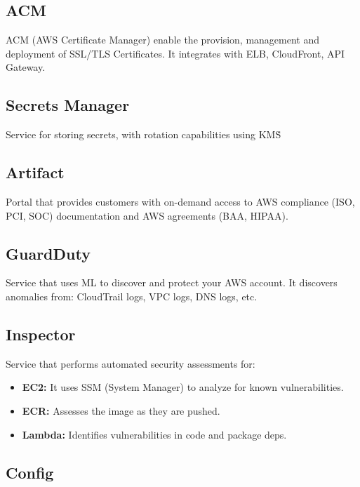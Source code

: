 \subsection{ACM}\label{subsec:acm}

ACM (AWS Certificate Manager) enable the provision, management and deployment of SSL/TLS Certificates.
It integrates with ELB, CloudFront, API Gateway.

\subsection{Secrets Manager}\label{subsec:secrets-manager}

Service for storing secrets, with rotation capabilities using KMS\.

\subsection{Artifact}\label{subsec:artifact}

Portal that provides customers with on-demand access to AWS compliance (ISO, PCI, SOC) documentation and
AWS agreements (BAA, HIPAA).

\subsection{GuardDuty}\label{subsec:guardduty}

Service that uses ML to discover and protect your AWS account.
It discovers anomalies from: CloudTrail logs, VPC logs, DNS logs, etc.

\subsection{Inspector}\label{subsec:inspector}

Service that performs automated security assessments for:

\begin{itemize}
    \item{\textbf{EC2:} It uses SSM (System Manager) to analyze for known vulnerabilities.}
    \item{\textbf{ECR:} Assesses the image as they are pushed.}
    \item{\textbf{Lambda:} Identifies vulnerabilities in code and package deps.}
\end{itemize}


\subsection{Config}\label{subsec:config}

